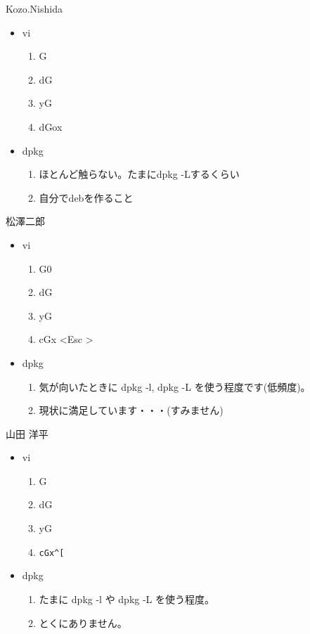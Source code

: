 \documentclass[mingoth,a4paper]{jsarticle}
\begin{document}
\begin{prework}{ Kozo.Nishida }
  \begin{itemize}
  \item vi
    \begin{enumerate}
    \item G
    \item dG
    \item yG
    \item dGox
    \end{enumerate}
  \item dpkg
    \begin{enumerate}
    \item ほとんど触らない。たまにdpkg -Lするくらい
    \item 自分でdebを作ること
    \end{enumerate}
  \end{itemize}
\end{prework}

\begin{prework}{ 松澤二郎 }
  \begin{itemize}
  \item vi
    \begin{enumerate}
    \item G0
    \item dG
    \item yG
    \item cGx \textless Esc \textgreater
    \end{enumerate}
  \item dpkg
    \begin{enumerate}
    \item 気が向いたときに dpkg -l, dpkg -L を使う程度です(低頻度)。
    \item 現状に満足しています・・・(すみません)
    \end{enumerate}
  \end{itemize}
\end{prework}

\begin{prework}{ 山田 洋平 }
  \begin{itemize}
  \item vi
    \begin{enumerate}
    \item G
    \item dG
    \item yG
    \item \verb+cGx^[+
    \end{enumerate}
  \item dpkg
    \begin{enumerate}
    \item たまに dpkg -l や dpkg -L を使う程度。
    \item とくにありません。
    \end{enumerate}
  \end{itemize}
\end{prework}
\end{document}
